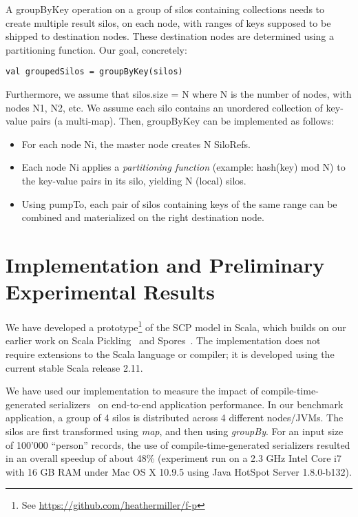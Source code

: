 \documentclass{easychair}
\begin{document}
A groupByKey operation on a group of silos containing collections needs to create multiple result silos, on each node, with ranges of keys supposed to be shipped to destination nodes. These destination nodes are determined using a partitioning function. Our goal, concretely:
\begin{verbatim}
val groupedSilos = groupByKey(silos)
\end{verbatim}
\noindent
Furthermore, we assume that silos.size = N where N is the number of nodes,
with nodes N1, N2, etc. We assume each silo contains an unordered collection
of key-value pairs (a multi-map). Then, groupByKey can be implemented as
follows:
\begin{itemize}
\item For each node Ni, the master node creates N SiloRefs.
\item Each node Ni applies a \emph{partitioning function} (example: hash(key) mod N) to
      the key-value pairs in its silo, yielding N (local) silos.
\item Using pumpTo, each pair of silos containing keys of the same range can be combined
      and materialized on the right destination node.
\end{itemize}



\section{Implementation and Preliminary Experimental Results}
\label{sec:impl}

We have developed a prototype\footnote{See \url{https://github.com/heathermiller/f-p}}
of the SCP model in Scala, which builds on our earlier work on
Scala Pickling~\cite{MillerHBO13} and Spores~\cite{MillerHO14}.
The implementation does not require extensions to the Scala language or compiler; it
is developed using the current stable Scala release 2.11.

We have used our implementation to measure the impact of
compile-time-generated serializers~\cite{MillerHBO13} on end-to-end application
performance. In our benchmark application, a group of 4 silos is distributed
across 4 different nodes/JVMs. The silos are first transformed using
\emph{map}, and then using \emph{groupBy}. For an input size of 100'000 ``person''
records, the use of compile-time-generated serializers resulted in
an overall speedup of about 48\% (experiment run on a 2.3 GHz Intel Core i7
with 16 GB RAM under Mac OS X 10.9.5 using Java HotSpot Server 1.8.0-b132).
\end{document}
